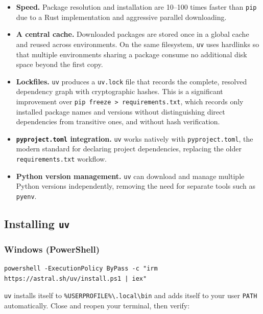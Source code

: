 \begin{itemize}
  \item \textbf{Speed.} Package resolution and installation are
        10--100 times faster than \texttt{pip} due to a Rust
        implementation and aggressive parallel downloading.
  \item \textbf{A central cache.} Downloaded packages are stored once
        in a global cache and reused across environments. On the same
        filesystem, \texttt{uv} uses hardlinks so that multiple
        environments sharing a package consume no additional disk space
        beyond the first copy.
  \item \textbf{Lockfiles.} \texttt{uv} produces a \texttt{uv.lock}
        file that records the complete, resolved dependency graph with
        cryptographic hashes. This is a significant improvement over
        \texttt{pip freeze > requirements.txt}, which records only
        installed package names and versions without distinguishing
        direct dependencies from transitive ones, and without hash
        verification.
  \item \textbf{\texttt{pyproject.toml} integration.} \texttt{uv}
        works natively with \texttt{pyproject.toml}, the modern
        standard for declaring project dependencies, replacing the
        older \texttt{requirements.txt} workflow.
  \item \textbf{Python version management.} \texttt{uv} can download
        and manage multiple Python versions independently, removing the
        need for separate tools such as \texttt{pyenv}.
\end{itemize}

\subsection{Installing \texttt{uv}}

\subsubsection{Windows (PowerShell)}

\begin{lstlisting}[style=windowsStyle, caption={Installing \texttt{uv} on Windows}]
powershell -ExecutionPolicy ByPass -c "irm https://astral.sh/uv/install.ps1 | iex"
\end{lstlisting}

\texttt{uv} installs itself to
\texttt{\%USERPROFILE\%\textbackslash.local\textbackslash bin} and
adds itself to your user \texttt{PATH} automatically. Close and reopen
your terminal, then verify:

